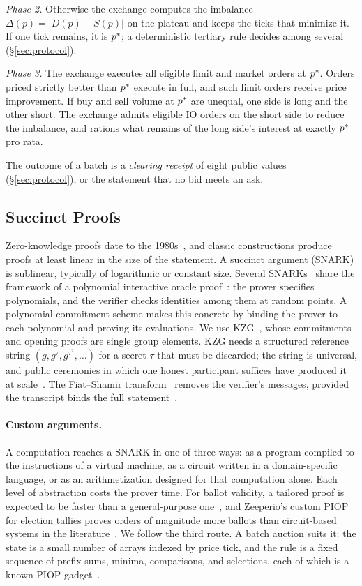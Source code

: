 \emph{Phase 2.} Otherwise the exchange computes the imbalance $\Delta(p) = |D(p) - S(p)|$ on the plateau and keeps the ticks that minimize it. If one tick remains, it is $p^{*}$; a deterministic tertiary rule decides among several (\S\ref{sec:protocol}).

\emph{Phase 3.} The exchange executes all eligible limit and market orders at $p^{*}$. Orders priced strictly better than $p^{*}$ execute in full, and such limit orders receive price improvement. If buy and sell volume at $p^{*}$ are unequal, one side is long and the other short. The exchange admits eligible IO orders on the short side to reduce the imbalance, and rations what remains of the long side's interest at exactly $p^{*}$ pro rata.

The outcome of a batch is a \emph{clearing receipt} of eight public values (\S\ref{sec:protocol}), or the statement that no bid meets an ask.

\subsection{Succinct Proofs}
\label{sec:snarks}

Zero-knowledge proofs date to the 1980s~\cite{gmw1986,bcc1988}, and classic constructions produce proofs at least linear in the size of the statement. A succinct argument (SNARK) is sublinear, typically of logarithmic or constant size. Several SNARKs~\cite{sonic2019,marlin2020,plonk2019} share the framework of a polynomial interactive oracle proof~\cite{dark2020}: the prover specifies polynomials, and the verifier checks identities among them at random points. A polynomial commitment scheme makes this concrete by binding the prover to each polynomial and proving its evaluations. We use KZG~\cite{kzg2010}, whose commitments and opening proofs are single group elements. KZG needs a structured reference string $(g, g^{\tau}, g^{\tau^2}, \dots)$ for a secret $\tau$ that must be discarded; the string is universal, and public ceremonies in which one honest participant suffices have produced it at scale~\cite{nikolaenko2024}. The Fiat--Shamir transform~\cite{fiatshamir1986} removes the verifier's messages, provided the transcript binds the full statement~\cite{bernhard2012,dao2023}.

\paragraph{Custom arguments.}
A computation reaches a SNARK in one of three ways: as a program compiled to the instructions of a virtual machine, as a circuit written in a domain-specific language, or as an arithmetization designed for that computation alone. Each level of abstraction costs the prover time. For ballot validity, a tailored proof is expected to be faster than a general-purpose one~\cite{huber2024}, and Zeeperio's custom PIOP for election tallies proves orders of magnitude more ballots than circuit-based systems in the literature~\cite{zeeperio2026}. We follow the third route. A batch auction suits it: the state is a small number of arrays indexed by price tick, and the rule is a fixed sequence of prefix sums, minima, comparisons, and selections, each of which is a known PIOP gadget~\cite{plonkbook}.


